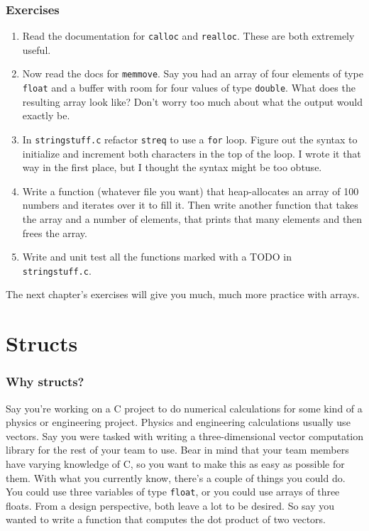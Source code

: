 \documentclass[ebook,11pt,oneside,openany]{memoir}
\newcommand{\cf}[1]{\texttt{#1}}
\begin{document}
\subsection{Exercises}
\begin{enumerate}
\item Read the documentation for \texttt{calloc} and \texttt{realloc}. These are both extremely useful.

\item Now read the docs for \cf{memmove}. Say you had an array of four elements of type \cf{float} and a buffer with room for four values of type \cf{double}. What does the resulting array look like? Don't worry too much about what the output would exactly be. 

\item In \texttt{stringstuff.c} refactor \texttt{streq} to use a \texttt{for} loop. Figure out the syntax to initialize and increment both characters in the top of the loop. I wrote it that way in the first place, but I thought the syntax might be too obtuse.

\item Write a function (whatever file you want) that heap-allocates an array of 100 numbers and iterates over it to fill it. Then write another function that takes the array and a number of elements, that prints that many elements and then frees the array.

\item Write and unit test all the functions marked with a TODO in \texttt{stringstuff.c}.

\end{enumerate}

The next chapter's exercises will give you much, much more practice with arrays.

\chapter{Structs}
\label{ch:struct}
\subsection{Why structs?}

Say you're working on a C project to do numerical calculations for some kind of a physics or engineering project. Physics and engineering calculations usually use vectors. Say you were tasked with writing a three-dimensional vector computation library for the rest of your team to use. Bear in mind that your team members have varying knowledge of C, so you want to make this as easy as possible for them. With what you currently know, there's a couple of things you could do. You could use three variables of type \texttt{float}, or you could use arrays of three floats. From a design perspective, both leave a lot to be desired. So say you wanted to write a function that computes the dot product of two vectors. 
\end{document}
